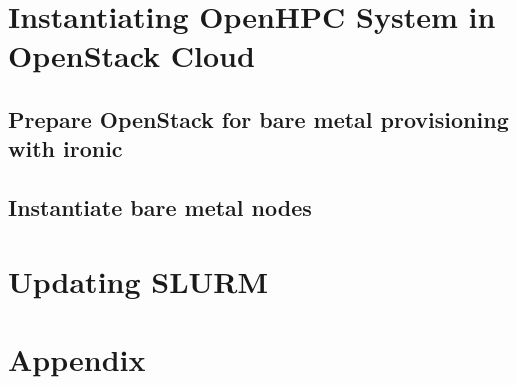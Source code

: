\documentclass[letterpaper]{article}
\begin{document}





\vspace*{-0.15cm}
\vspace*{-0.50cm}

\clearpage
\section{Instantiating OpenHPC System in OpenStack Cloud}

	
\clearpage
\subsection{Prepare OpenStack for bare metal provisioning with ironic} \label{sec:o-s_prep-ironic}


\vspace*{-0.15cm}
\newpage
\subsection{Instantiate bare metal nodes} \label{sec:instantiate-bare-metal}


\section{Updating SLURM}

	

\section{Appendix}

	

\end{document}
